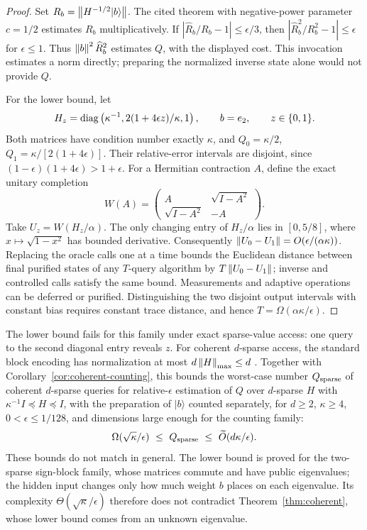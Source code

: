 \begin{proof}
Set $R_b=\left\lVert H^{-1/2}|b\rangle\right\rVert$.  The cited theorem with negative-power
parameter $c=1/2$ estimates $R_b$ multiplicatively.  If
$|\widehat R_b/R_b-1|\leq\epsilon/3$, then
$|\widehat R_b^2/R_b^2-1|\leq\epsilon$ for $\epsilon\leq1$.
Thus $\left\lVert b\right\rVert^2\widehat R_b^2$ estimates $Q$, with the displayed cost.
This invocation estimates a norm directly; preparing the normalized
inverse state alone would not provide $Q$.

For the lower bound, let
\[
 H_z=\operatorname{diag}\left(\kappa^{-1},
           2(1+4\epsilon z)/\kappa,1\right),\qquad
 b=e_2,\qquad z\in\{0,1\}.
\]
Both matrices have condition number exactly $\kappa$, and
$Q_0=\kappa/2$, $Q_1=\kappa/[2(1+4\epsilon)]$.  Their relative-error
intervals are disjoint, since
$(1-\epsilon)(1+4\epsilon)>1+\epsilon$.
For a Hermitian contraction $A$, define the exact unitary completion
\[
 W(A)=\begin{pmatrix}A&\sqrt{I-A^2}\\
                    \sqrt{I-A^2}&-A\end{pmatrix}.
\]
Take $U_z=W(H_z/\alpha)$.  The only changing entry of $H_z/\alpha$
lies in $[0,5/8]$, where $x\mapsto\sqrt{1-x^2}$ has bounded
derivative.
Consequently
$\left\lVert U_0-U_1\right\rVert=O(\epsilon/(\alpha\kappa))$.
Replacing the oracle calls one at a time bounds the Euclidean distance
between final purified states of any $T$-query algorithm by
$T\left\lVert U_0-U_1\right\rVert$; inverse and controlled calls satisfy the same bound.
Measurements and adaptive operations can be deferred or purified.
Distinguishing the two disjoint output intervals with constant bias
requires constant trace distance, and hence $T=\Omega(\alpha\kappa/\epsilon)$.
\end{proof}

The lower bound fails for this family under exact sparse-value
access: one query to the second diagonal entry reveals $z$.  For coherent
$d$-sparse access, the standard block encoding has normalization at most
$d\left\lVert H\right\rVert_{\max}\leq d$ \citep{GilyenEtAl2019}.  Together with
Corollary~\ref{cor:coherent-counting}, this bounds the worst-case number
$Q_{\rm sparse}$ of coherent $d$-sparse queries for relative-$\epsilon$
estimation of $Q$ over $d$-sparse $H$ with $\kappa^{-1}I\preceq H\preceq I$, with the preparation of $|b\rangle$ counted separately,
for $d\geq2$, $\kappa\geq4$, $0<\epsilon\leq1/128$, and dimensions
large enough for the counting family:
\begin{equation}\label{eq:sparse-quantum-gap}
 \Omega(\sqrt\kappa/\epsilon)
 \ \leq\ Q_{\rm sparse}\ \leq\
 \widetilde O(d\kappa/\epsilon).
\end{equation}
These bounds do not match in general.
The lower bound is proved for the two-sparse sign-block family, whose
matrices commute and have public eigenvalues; the hidden input changes
only how much weight $b$ places on each eigenvalue.  Its complexity
$\Theta(\sqrt\kappa/\epsilon)$ therefore does not
contradict Theorem~\ref{thm:coherent}, whose lower bound comes from an
unknown eigenvalue.

